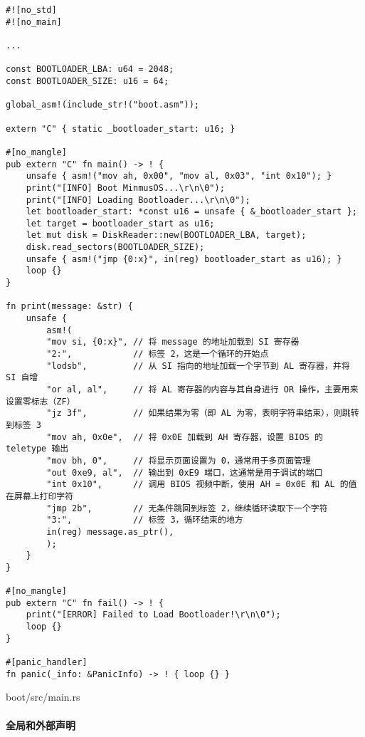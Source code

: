 \begin{listing}[htbp]
    \begin{verbatim}
#![no_std]
#![no_main]

...

const BOOTLOADER_LBA: u64 = 2048;
const BOOTLOADER_SIZE: u16 = 64;

global_asm!(include_str!("boot.asm"));

extern "C" { static _bootloader_start: u16; }

#[no_mangle]
pub extern "C" fn main() -> ! {
    unsafe { asm!("mov ah, 0x00", "mov al, 0x03", "int 0x10"); }
    print("[INFO] Boot MinmusOS...\r\n\0");
    print("[INFO] Loading Bootloader...\r\n\0");
    let bootloader_start: *const u16 = unsafe { &_bootloader_start };
    let target = bootloader_start as u16;
    let mut disk = DiskReader::new(BOOTLOADER_LBA, target);
    disk.read_sectors(BOOTLOADER_SIZE);
    unsafe { asm!("jmp {0:x}", in(reg) bootloader_start as u16); }
    loop {}
}

fn print(message: &str) {
    unsafe {
        asm!(
        "mov si, {0:x}", // 将 message 的地址加载到 SI 寄存器
        "2:",            // 标签 2，这是一个循环的开始点
        "lodsb",         // 从 SI 指向的地址加载一个字节到 AL 寄存器，并将 SI 自增
        "or al, al",     // 将 AL 寄存器的内容与其自身进行 OR 操作，主要用来设置零标志（ZF）
        "jz 3f",         // 如果结果为零（即 AL 为零，表明字符串结束），则跳转到标签 3
        "mov ah, 0x0e",  // 将 0x0E 加载到 AH 寄存器，设置 BIOS 的 teletype 输出
        "mov bh, 0",     // 将显示页面设置为 0，通常用于多页面管理
        "out 0xe9, al",  // 输出到 0xE9 端口，这通常是用于调试的端口
        "int 0x10",      // 调用 BIOS 视频中断，使用 AH = 0x0E 和 AL 的值在屏幕上打印字符
        "jmp 2b",        // 无条件跳回到标签 2，继续循环读取下一个字符
        "3:",            // 标签 3，循环结束的地方
        in(reg) message.as_ptr(),
        );
    }
}

#[no_mangle]
pub extern "C" fn fail() -> ! {
    print("[ERROR] Failed to Load Bootloader!\r\n\0");
    loop {}
}

#[panic_handler]
fn panic(_info: &PanicInfo) -> ! { loop {} }
    \end{verbatim}
    \caption{boot/src/main.rs}\label{lst:BootSrcMain}
\end{listing}

\paragraph{全局和外部声明}

